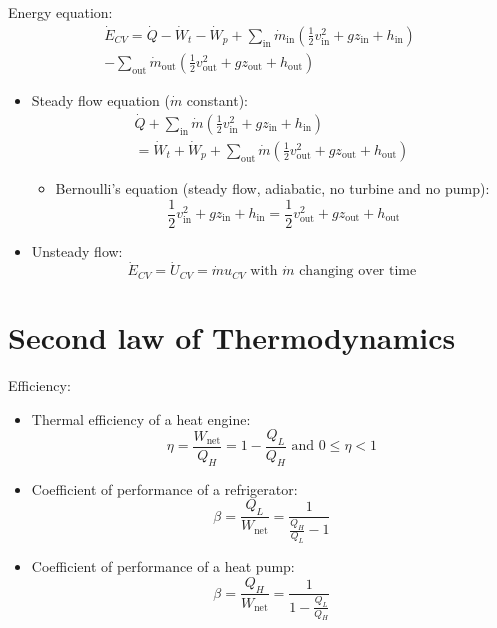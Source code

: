 \documentclass[10pt, twocolumn]{article}
\begin{document}
Energy equation:
\begin{multline*}
  \dot{E}_{CV} = \dot{Q} - \dot{W}_t - \dot{W}_p
  + \sum_{\mathrm{in}}{\dot{m}_{\mathrm{in}}\left( \frac{1}{2}v_{\mathrm{in}}^2 + gz_{\mathrm{in}} + h_{\mathrm{in}} \right)} \\
  - \sum_{\mathrm{out}}{\dot{m}_{\mathrm{out}}\left( \frac{1}{2}v_{\mathrm{out}}^2 + gz_{\mathrm{out}} + h_{\mathrm{out}} \right)}
\end{multline*}

\begin{itemize}
  \item Steady flow equation (\(\dot{m}\) constant):
        \begin{multline*}
          \dot{Q} + \sum_{\mathrm{in}}{\dot{m}\left( \frac{1}{2}v_{\mathrm{in}}^2 + gz_{\mathrm{in}} + h_{\mathrm{in}} \right)} \\
          = \dot{W}_t + \dot{W}_p + \sum_{\mathrm{out}}{\dot{m}\left( \frac{1}{2}v_{\mathrm{out}}^2 + gz_{\mathrm{out}} + h_{\mathrm{out}} \right)}
        \end{multline*}
        \begin{itemize}
          \item Bernoulli's equation (steady flow, adiabatic, no turbine and no pump):
                \[
                  \frac{1}{2}v_{\mathrm{in}}^2 + gz_{\mathrm{in}} + h_{\mathrm{in}} = \frac{1}{2}v_{\mathrm{out}}^2 + gz_{\mathrm{out}} + h_{\mathrm{out}}
                \]
        \end{itemize}
  \item Unsteady flow:
        \[
          \dot{E}_{CV} = {\dot{U}}_{CV} = {\dot{m}u}_{CV}\text{ with } \dot{m}\text{ changing over time}
        \]
\end{itemize}

\section{Second law of Thermodynamics}
Efficiency:
\begin{itemize}
  \item Thermal efficiency of a heat engine:
        \[
          \eta = \frac{W_{\mathrm{net}}}{Q_H } = 1 - \frac{Q_L }{Q_H } \text{ and } 0 \leqslant \eta < 1
        \]
  \item Coefficient of performance of a refrigerator:
        \[
          \beta = \frac{Q_L }{W_{\mathrm{net}}} = \frac{1}{\frac{Q_H }{Q_L } - 1}
        \]
  \item Coefficient of performance of a heat pump:
        \[
          \beta = \frac{Q_H }{W_{\mathrm{net}}} = \frac{1}{1 - \frac{Q_L }{Q_H }}
        \]
\end{itemize}
\end{document}

